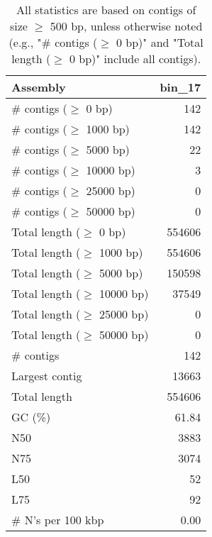 \documentclass[12pt,a4paper]{article}
\begin{document}
\begin{table}[ht]
\begin{center}
\caption{All statistics are based on contigs of size $\geq$ 500 bp, unless otherwise noted (e.g., "\# contigs ($\geq$ 0 bp)" and "Total length ($\geq$ 0 bp)" include all contigs).}
\begin{tabular}{|l*{1}{|r}|}
\hline
Assembly & bin\_17 \\ \hline
\# contigs ($\geq$ 0 bp) & 142 \\ \hline
\# contigs ($\geq$ 1000 bp) & 142 \\ \hline
\# contigs ($\geq$ 5000 bp) & 22 \\ \hline
\# contigs ($\geq$ 10000 bp) & 3 \\ \hline
\# contigs ($\geq$ 25000 bp) & 0 \\ \hline
\# contigs ($\geq$ 50000 bp) & 0 \\ \hline
Total length ($\geq$ 0 bp) & 554606 \\ \hline
Total length ($\geq$ 1000 bp) & 554606 \\ \hline
Total length ($\geq$ 5000 bp) & 150598 \\ \hline
Total length ($\geq$ 10000 bp) & 37549 \\ \hline
Total length ($\geq$ 25000 bp) & 0 \\ \hline
Total length ($\geq$ 50000 bp) & 0 \\ \hline
\# contigs & 142 \\ \hline
Largest contig & 13663 \\ \hline
Total length & 554606 \\ \hline
GC (\%) & 61.84 \\ \hline
N50 & 3883 \\ \hline
N75 & 3074 \\ \hline
L50 & 52 \\ \hline
L75 & 92 \\ \hline
\# N's per 100 kbp & 0.00 \\ \hline
\end{tabular}
\end{center}
\end{table}
\end{document}
